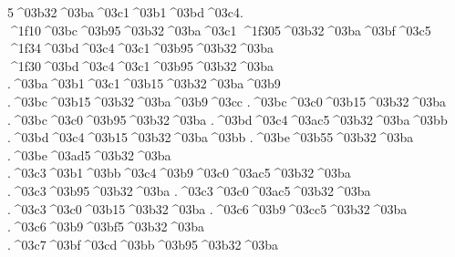 {5^^^^03b32^^^^03ba^^^^03c1^^^^03b1^^^^03bd^^^^03c4.    %
^^^^1f10^^^^03bc^^^^03b95^^^^03b32^^^^03ba^^^^03c1    %
^^^^1f305^^^^03b32^^^^03ba^^^^03bf^^^^03c5     %
^^^^1f34^^^^03bd^^^^03c4^^^^03c1^^^^03b95^^^^03b32^^^^03ba  %
^^^^1f30^^^^03bd^^^^03c4^^^^03c1^^^^03b95^^^^03b32^^^^03ba
.^^^^03ba^^^^03b1^^^^03c1^^^^03b15^^^^03b32^^^^03ba^^^^03b9   %
.^^^^03bc^^^^03b15^^^^03b32^^^^03ba^^^^03b9^^^^03cc   %
.^^^^03bc^^^^03c0^^^^03b15^^^^03b32^^^^03ba     %
.^^^^03bc^^^^03c0^^^^03b95^^^^03b32^^^^03ba     %
.^^^^03bd^^^^03c4^^^^03ac5^^^^03b32^^^^03ba^^^^03bb   %
.^^^^03bd^^^^03c4^^^^03b15^^^^03b32^^^^03ba^^^^03bb    %
.^^^^03be^^^^03b55^^^^03b32^^^^03ba      %
.^^^^03be^^^^03ad5^^^^03b32^^^^03ba
.^^^^03c3^^^^03b1^^^^03bb^^^^03c4^^^^03b9^^^^03c0^^^^03ac5^^^^03b32^^^^03ba %
.^^^^03c3^^^^03b95^^^^03b32^^^^03ba      %
.^^^^03c3^^^^03c0^^^^03ac5^^^^03b32^^^^03ba    %
.^^^^03c3^^^^03c0^^^^03b15^^^^03b32^^^^03ba
.^^^^03c6^^^^03b9^^^^03cc5^^^^03b32^^^^03ba    %
.^^^^03c6^^^^03b9^^^^03bf5^^^^03b32^^^^03ba
.^^^^03c7^^^^03bf^^^^03cd^^^^03bb^^^^03b95^^^^03b32^^^^03ba  %
}
